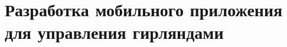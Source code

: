 \section{Разработка мобильного приложения для управления гирляндами}
\label{sec:develop}













